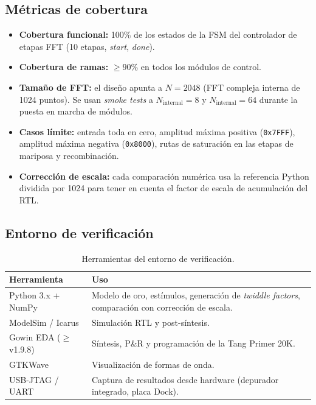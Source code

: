 \documentclass[11pt,a4paper]{article}
\begin{document}
\subsection{Métricas de cobertura}
\begin{itemize}[leftmargin=1.4em]
  \item \textbf{Cobertura funcional:} 100\% de los estados de la FSM del
    controlador de etapas FFT (10 etapas, \emph{start}, \emph{done}).
  \item \textbf{Cobertura de ramas:} $\geq 90\%$ en todos los módulos de control.
  \item \textbf{Tamaño de FFT:} el diseño apunta a $N=2048$ (FFT compleja interna
    de 1024 puntos). Se usan \emph{smoke tests} a $N_{\text{internal}}=8$ y
    $N_{\text{internal}}=64$ durante la puesta en marcha de módulos.
  \item \textbf{Casos límite:} entrada toda en cero, amplitud máxima positiva
    (\texttt{0x7FFF}), amplitud máxima negativa (\texttt{0x8000}), rutas de
    saturación en las etapas de mariposa y recombinación.
  \item \textbf{Corrección de escala:} cada comparación numérica usa la referencia
    Python dividida por 1024 para tener en cuenta el factor de escala de
    acumulación del RTL.
\end{itemize}

\subsection{Entorno de verificación}
\renewcommand{\arraystretch}{1.2}
\begin{table}[H]
\centering
\caption{Herramientas del entorno de verificación.}\label{tab:env}
\begin{tabularx}{\textwidth}{@{}l Y@{}}
\toprule
\textbf{Herramienta} & \textbf{Uso}\\
\midrule
Python 3.x + NumPy & Modelo de oro, estímulos, generación de \emph{twiddle factors}, comparación con corrección de escala.\\
ModelSim / Icarus & Simulación RTL y post-síntesis.\\
Gowin EDA ($\geq$ v1.9.8) & Síntesis, P\&R y programación de la Tang Primer 20K.\\
GTKWave & Visualización de formas de onda.\\
USB-JTAG / UART & Captura de resultados desde hardware (depurador integrado, placa Dock).\\
\bottomrule
\end{tabularx}
\end{table}
\end{document}
